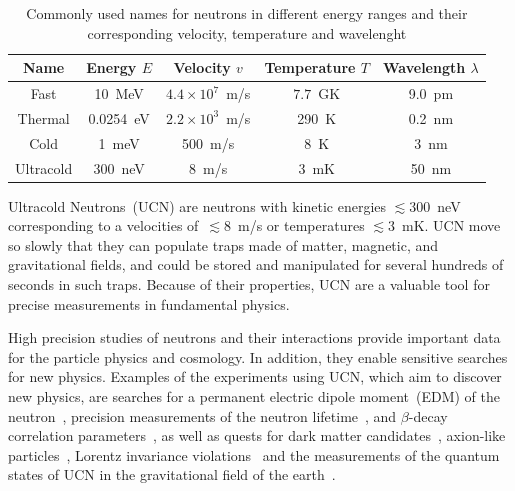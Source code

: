 \begin{table}
  \label{tab:ucnenergy}
  \centering
  \begin{tabular}{|c|c|c|c|c|}
    \hline
    Name & Energy $E$ & Velocity $v$ & Temperature $T$ & Wavelength $\lambda$ \\
    \hline
    \hline
    Fast & 10~MeV & $4.4 \times 10^7$~m/s & $7.7$~GK & 9.0~pm \\
    \hline
    Thermal & 0.0254~eV & $ 2.2 \times 10^3$~m/s & 290~K & 0.2~nm \\
    \hline
    Cold & 1~meV & 500~m/s & 8~K & 3~nm \\
    \hline
    Ultracold & 300~neV & 8~m/s & 3~mK & 50~nm \\
    \hline
  \end{tabular}
  \caption{Commonly used names for neutrons in different energy ranges
    and their corresponding velocity, temperature and wavelenght}
\end{table}



Ultracold Neutrons~(UCN) are neutrons with kinetic energies
$\lesssim 300$~neV corresponding to a velocities of~$\lesssim 8$~m/s or
temperatures $\lesssim 3$~mK. UCN move so slowly that they can
populate traps made of matter, magnetic, and gravitational fields, and
could be stored and manipulated for several hundreds of seconds in such
traps. Because of their properties, UCN are a valuable tool for precise
measurements in fundamental physics.

High precision studies of neutrons and their interactions provide
important data for the particle physics and cosmology. In addition,
they enable sensitive searches for new physics. Examples of the
experiments using UCN, which aim to discover new physics, are searches
for a permanent electric dipole moment~(EDM) of the
neutron~\cite{Baker2006,Serebrov2009,Lam_Gol,Altarev2010,Pendlebury2015},
precision measurements of the neutron
lifetime~\cite{Paul2009,Wietfeldt2011,Arzumanov2000,Serebrov2005,Huffman},
and $\beta$-decay correlation parameters~\cite{Mendenhall,Broussard},
as well as quests for dark matter
candidates~\cite{Serebrov2008,Zimmer2010}, axion-like
particles~\cite{Baessler,Serebrov2010,Afach2015}, Lorentz
invariance violations~\cite{Altarev2009} and the measurements of the
quantum states of UCN in the gravitational field of the
earth~\cite{Nesvizhevsky2003}.


